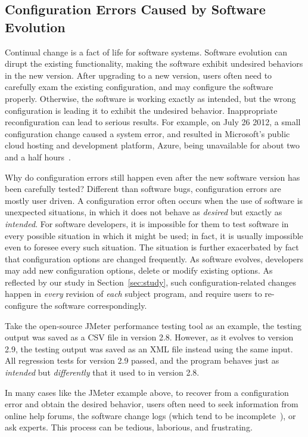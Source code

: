 \subsection{Configuration Errors Caused by Software Evolution}

Continual change is a fact of life for software systems.
Software evolution can dirupt the existing functionality,
making the software exhibit undesired behaviors in the
new version. After upgrading to a new version,
users often need to carefully exam the existing configuration, and may
configure the software properly. 
Otherwise, the software is working exactly as intended, but the
wrong configuration is leading it to exhibit the undesired behavior.
Inappropriate reconfiguration can lead to serious results.
For example, on July 26 2012, a small configuration
change caused a system error, and resulted in
Microsoft's public cloud hosting and development platform, Azure,
being unavailable for about two and a half hours~\cite{msdown}.

Why do configuration errors still happen even after the
new software version has been carefully
tested? Different than software bugs, configuration errors are mostly user driven.
A configuration error often occurs when the use of software is unexpected
situations, in which it does not behave as \textit{desired} but
exactly as \textit{intended}. For software developers,
it is impossible for them to test software in every possible
situation in which it might be used; in fact, it is usually
impossible even to foresee every such situation. The situation
is further exacerbated by fact that configuration options
are changed frequently. As software evolves, developers may
add new configuration options, delete or modify existing options.
As reflected by our study in Section~\ref{sec:study}, such
configuration-related changes happen in \textit{every} revision
of \textit{each} subject program, and require users to
re-configure the software correspondingly.


Take the open-source JMeter performance testing tool as an example, 
the testing output was saved as a CSV file in version 2.8.
However, as it evolves to version 2.9, the testing output
was saved as an XML file instead using the same input.
All regression tests for version 2.9 passed, and the program
behaves just as \textit{intended} but \textit{differently} that
it used to in version 2.8.


In many cases like the JMeter example above, to recover
from a configuration error and obtain the desired behavior,
users often need to seek information from online help forums, the software
change logs (which tend to be incomplete~\cite{}), or
ask experts. This process can be tedious,
laborious, and frustrating.

